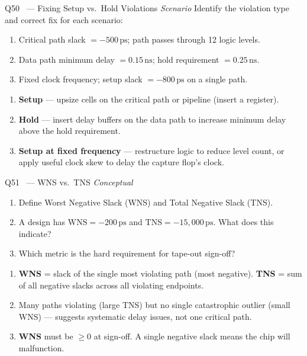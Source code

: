 \documentclass[12pt,a4paper]{article}
\newcommand{\advanced}{%
  \fbox{\textcolor{advred}{\bfseries\sffamily\small ADVANCED}}}
\newcommand{\moderate}{%
  \fbox{\textcolor{modoran}{\bfseries\sffamily\small MODERATE}}}
\begin{document}
\begin{questionbox}{Q50 \advanced\ --- Fixing Setup vs.\ Hold Violations \hfill\textit{Scenario}}
Identify the violation type and correct fix for each scenario:
\begin{enumerate}
  \item Critical path slack $= -500\,\text{ps}$; path passes through 12 logic levels.
  \item Data path minimum delay $= 0.15\,\text{ns}$; hold requirement $= 0.25\,\text{ns}$.
  \item Fixed clock frequency; setup slack $= -800\,\text{ps}$ on a single path.
\end{enumerate}
\end{questionbox}

\begin{answerbox}
\begin{enumerate}
  \item \textbf{Setup} --- upsize cells on the critical path or pipeline (insert a register).
  \item \textbf{Hold} --- insert delay buffers on the data path to increase minimum delay above the hold requirement.
  \item \textbf{Setup at fixed frequency} --- restructure logic to reduce level count, or apply useful clock skew to delay the capture flop's clock.
\end{enumerate}
\end{answerbox}

\begin{questionbox}{Q51 \moderate\ --- WNS vs.\ TNS \hfill\textit{Conceptual}}
\begin{enumerate}[label=\textbf{\alph*)}]
  \item Define Worst Negative Slack (WNS) and Total Negative Slack (TNS).
  \item A design has $\text{WNS} = -200\,\text{ps}$ and $\text{TNS} = -15{,}000\,\text{ps}$. What does this indicate?
  \item Which metric is the hard requirement for tape-out sign-off?
\end{enumerate}
\end{questionbox}

\begin{answerbox}
\begin{enumerate}[label=\textbf{\alph*)}]
  \item \textbf{WNS} = slack of the single most violating path (most negative). \textbf{TNS} = sum of all negative slacks across all violating endpoints.
  \item Many paths violating (large TNS) but no single catastrophic outlier (small WNS) --- suggests systematic delay issues, not one critical path.
  \item \textbf{WNS} must be $\geq 0$ at sign-off. A single negative slack means the chip will malfunction.
\end{enumerate}
\end{answerbox}
\end{document}
